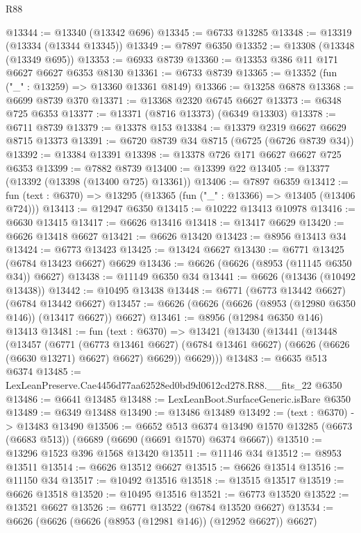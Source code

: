 \begin{lexlean}{R88}
\begin{coremodule}
@13344 := @13340 (@13342 @696)
@13345 := @6733 @13285
@13348 := @13319 (@13334 (@13344 @13345))
@13349 := @7897 @6350
@13352 := @13308 (@13348 (@13349 @695))
@13353 := @6933 @8739
@13360 := @13353 @386 @11 @171 @6627 @6627 @6353 @8130
@13361 := @6733 @8739
@13365 := @13352 (fun ("_" : @13259) => @13360 @13361 @8149)
@13366 := @13258 @6878
@13368 := @6699 @8739 @370
@13371 := @13368 @2320 @6745 @6627
@13373 := @6348 @725 @6353
@13377 := @13371 (@8716 @13373) (@6349 @13303)
@13378 := @6711 @8739
@13379 := @13378 @153
@13384 := @13379 @2319 @6627 @6629 @8715 @13373
@13391 := @6720 @8739 @34 @8715 (@6725 (@6726 @8739 @34))
@13392 := @13384 @13391
@13398 := @13378 @726 @171 @6627 @6627 @725 @6353
@13399 := @7882 @8739
@13400 := @13399 @22
@13405 := @13377 (@13392 (@13398 (@13400 @725) @13361))
@13406 := @7897 @6359
@13412 := fun (text : @6370) => @13295 (@13365 (fun ("_" : @13366) => @13405 (@13406 @724)))
@13413 := @12947 @6350
@13415 := @10222 @13413 @10978
@13416 := @6630 @13415
@13417 := @6626 @13416
@13418 := @13417 @6629
@13420 := @6626 @13418 @6627
@13421 := @6626 @13420
@13423 := @8956 @13413 @34
@13424 := @6773 @13423
@13425 := @13424 @6627
@13430 := @6771 @13425 (@6784 @13423 @6627) @6629
@13436 := @6626 (@6626 (@8953 (@11145 @6350 @34)) @6627)
@13438 := @11149 @6350 @34
@13441 := @6626 (@13436 (@10492 @13438))
@13442 := @10495 @13438
@13448 := @6771 (@6773 @13442 @6627) (@6784 @13442 @6627)
@13457 := @6626 (@6626 (@6626 (@8953 (@12980 @6350 @146)) (@13417 @6627)) @6627)
@13461 := @8956 (@12984 @6350 @146) @13413
@13481 := fun (text : @6370) =>
  @13421
    (@13430
      (@13441
        (@13448
          (@13457
            (@6771
              (@6773 @13461 @6627)
              (@6784 @13461 @6627)
              (@6626 (@6626 (@6630 @13271) @6627) @6627)
              @6629))
          @6629)))
@13483 := @6635 @513 @6374
@13485 := LexLeanPreserve.Cae4456d77aa62528ed0bd9d0612cd278.R88.__fits_22 @6350
@13486 := @6641 @13485
@13488 := LexLeanBoot.SurfaceGeneric.isBare @6350
@13489 := @6349 @13488
@13490 := @13486 @13489
@13492 := (text : @6370) -> @13483 @13490
@13506 := @6652
    @513
    @6374
    @13490
    @1570
    @13285
    (@6673 (@6683 @513))
    (@6689 (@6690 (@6691 @1570) @6374 @6667))
@13510 := @13296 @1523 @396 @1568 @13420
@13511 := @11146 @34
@13512 := @8953 @13511
@13514 := @6626 @13512 @6627
@13515 := @6626 @13514
@13516 := @11150 @34
@13517 := @10492 @13516
@13518 := @13515 @13517
@13519 := @6626 @13518
@13520 := @10495 @13516
@13521 := @6773 @13520
@13522 := @13521 @6627
@13526 := @6771 @13522 (@6784 @13520 @6627)
@13534 := @6626 (@6626 (@6626 (@8953 (@12981 @146)) (@12952 @6627)) @6627)

\end{coremodule}
\end{lexlean}
